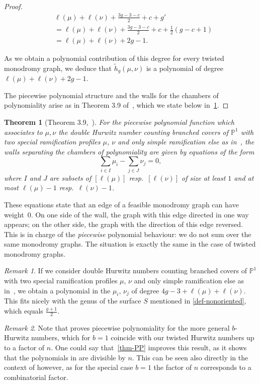 \documentclass[10pt]{amsart}
\theoremstyle{plain}
\theoremstyle{definition}
\theoremstyle{definition}
\theoremstyle{plain}
\theoremstyle{plain}
\theoremstyle{remark}
\newtheorem{rema}[rema]{Remark}
\theoremstyle{plain}
\newtheorem{theo}[theo]{Theorem}
\theoremstyle{plain}
\begin{document}
\begin{proof}
\begin{align*}
&\ell(\mu)+\ell(\nu)+\frac{3g-3-c}{2}+c+g'
\\&= \ell(\mu)+\ell(\nu)+\frac{3g-3-c}{2}+c+\frac{1}{2}(g-c+1)
\\&= \ell(\mu)+\ell(\nu)+2g-1.
\end{align*}

As we obtain a polynomial contribution of this degree for every twisted monodromy graph, we deduce that $\tilde{h}_g(\mu,\nu)$ is a polynomial of degree $\ell(\mu)+\ell(\nu)+2g-1$. 

The piecewise polynomial structure and the walls for the chambers of polynomiality arise as in Theorem 3.9 of~\cite{CJM11}, which we state below in~\cref{thm-walls}.
\end{proof}

\begin{theo}[Theorem 3.9,~\cite{CJM11}]\label{thm-walls}
For the piecewise polynomial function which associates to $\mu,\nu$ the double Hurwitz number counting branched covers of $\mathbb{P}^1$ with two special ramification profiles $\mu$, $\nu$ and only simple ramification else as in~\cite{GJV05, CJM11}, the walls separating the chambers  of polynomiality are given by equations of the form $$\sum_{i\in I} \mu_i - \sum_{j\in J} \nu_j=0,$$ where $I$ and $J$ are subsets of $[\ell(\mu)]$ resp.\ $[\ell(\nu)]$ of size at least $1$ and at most $\ell(\mu)-1$ resp.\ $\ell(\nu)-1$.
\end{theo}
These equations state that an edge of a feasible monodromy graph can have weight~$0$. On one side of the wall, the graph with this edge directed in one way appears; on the other side, the graph with the direction of this edge reversed. This is in charge of the \emph{piecewise} polynomial behaviour: we do not sum over the same monodromy graphs. The situation is exactly the same in the case of twisted monodromy graphs.

\begin{rema}
If we consider double Hurwitz numbers counting branched covers of $\mathbb{P}^1$ with two special ramification profiles $\mu$, $\nu$ and only simple ramification else as in~\cite{GJV05, CJM11}, we obtain a polynomial in the $\mu_i$, $\nu_j$ of degree $4g-3+\ell(\mu)+\ell(\nu)$.
This fits nicely with the genus of the surface $S$ mentioned in \cref{def-nonoriented}, which equals $\frac{g+1}{2}$.
\end{rema}

\begin{rema}
    Note that \cite[Theorem 6.6]{chapuy2020non} proves piecewise polynomiality for the more general $b$-Hurwitz numbers, which for $b=1$ coincide with our twisted Hurwitz numbers up to a factor of $n$. 
    One could say that~\cref{thm-PP} improves this result, as it shows that the polynomials in \cite[Theorem 6.6]{chapuy2020non} are divisible by $n$. This can be seen also directly in the context of \cite[Theorem 6.6]{chapuy2020non} however, as for the special case $b=1$ the factor of $n$ corresponds to a combinatorial factor.
\end{rema}
\end{document}
